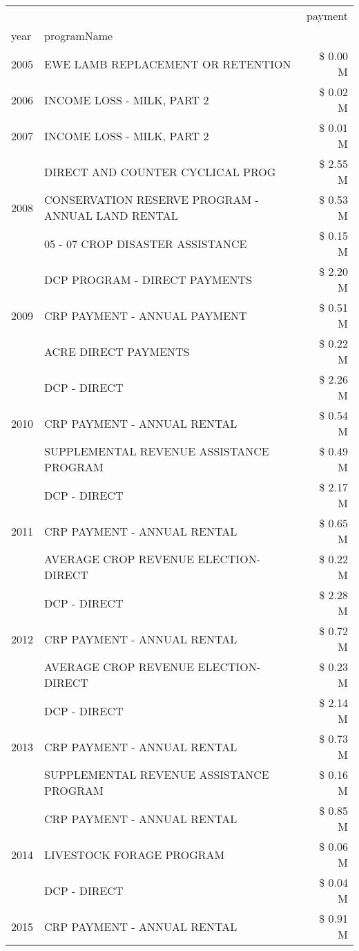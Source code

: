 \begin{tabular}{llr}
\toprule
 &  & payment \\
year & programName &  \\
\midrule
2005 & EWE LAMB REPLACEMENT OR RETENTION & \$ 0.00 M \\
\cline{1-3}
2006 & INCOME LOSS - MILK, PART 2 & \$ 0.02 M \\
\cline{1-3}
2007 & INCOME LOSS - MILK, PART 2 & \$ 0.01 M \\
\cline{1-3}
\multirow[t]{3}{*}{2008} & DIRECT AND COUNTER CYCLICAL PROG & \$ 2.55 M \\
 & CONSERVATION RESERVE PROGRAM - ANNUAL LAND RENTAL & \$ 0.53 M \\
 & 05 - 07 CROP DISASTER ASSISTANCE & \$ 0.15 M \\
\cline{1-3}
\multirow[t]{3}{*}{2009} & DCP PROGRAM - DIRECT PAYMENTS & \$ 2.20 M \\
 & CRP PAYMENT - ANNUAL PAYMENT & \$ 0.51 M \\
 & ACRE DIRECT PAYMENTS & \$ 0.22 M \\
\cline{1-3}
\multirow[t]{3}{*}{2010} & DCP - DIRECT & \$ 2.26 M \\
 & CRP PAYMENT - ANNUAL RENTAL & \$ 0.54 M \\
 & SUPPLEMENTAL REVENUE ASSISTANCE PROGRAM & \$ 0.49 M \\
\cline{1-3}
\multirow[t]{3}{*}{2011} & DCP - DIRECT & \$ 2.17 M \\
 & CRP PAYMENT - ANNUAL RENTAL & \$ 0.65 M \\
 & AVERAGE CROP REVENUE ELECTION-DIRECT & \$ 0.22 M \\
\cline{1-3}
\multirow[t]{3}{*}{2012} & DCP - DIRECT & \$ 2.28 M \\
 & CRP PAYMENT - ANNUAL RENTAL & \$ 0.72 M \\
 & AVERAGE CROP REVENUE ELECTION-DIRECT & \$ 0.23 M \\
\cline{1-3}
\multirow[t]{3}{*}{2013} & DCP - DIRECT & \$ 2.14 M \\
 & CRP PAYMENT - ANNUAL RENTAL & \$ 0.73 M \\
 & SUPPLEMENTAL REVENUE ASSISTANCE PROGRAM & \$ 0.16 M \\
\cline{1-3}
\multirow[t]{3}{*}{2014} & CRP PAYMENT - ANNUAL RENTAL & \$ 0.85 M \\
 & LIVESTOCK FORAGE PROGRAM & \$ 0.06 M \\
 & DCP - DIRECT & \$ 0.04 M \\
\cline{1-3}
\multirow[t]{3}{*}{2015} & CRP PAYMENT - ANNUAL RENTAL & \$ 0.91 M \\

\end{tabular}
